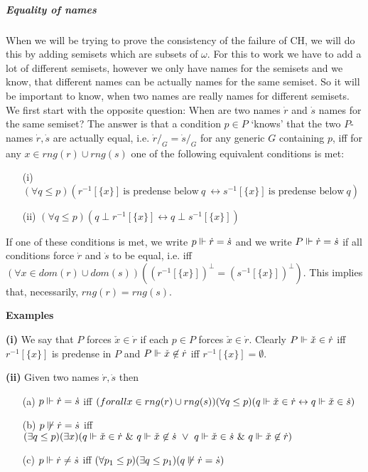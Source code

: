 \subparagraph{Equality of names}
When we will be trying to prove the consistency of the failure of CH, we will do this by adding semisets which are subsets of $\omega$.
For this to work we have to add a lot of different semisets, however we only have names for the semisets and we know, that different
names can be actually names for the same semiset. So it will be important to know, when two names are really names for different semisets.
We first start with the opposite question: When are two names $\dot{r}$ and $\dot{s}$ names for the same semiset?
The answer is that a condition $p\in P$ `knows' that the two $P$-names $\dot{r},\dot{s}$ are actually equal, i.e. $\dot{r}/_G=\dot{s}/_G$ for any generic $G$ containing $p$, iff for any $x\in rng(r)\cup rng(s)$ one of the following equivalent conditions is met:
\begin{itemize}
 \item[(i)]  $(\forall q\leq p)(r^{-1}[\{x\}]\ \mbox{is predense below}\ q\ \leftrightarrow s^{-1}[\{x\}]\ \mbox{is predense below}\ q)$
 \item[(ii)] $(\forall q\leq p)(q\perp r^{-1}[\{x\}]\leftrightarrow q\perp s^{-1}[\{x\}])$
\end{itemize}
If one of these conditions is met, we write $p\Vdash\dot{r}=\dot{s}$ and we write $P\Vdash\dot{r}=\dot{s}$ if all conditions
force $\dot{r}$ and $\dot{s}$ to be equal, i.e. iff $(\forall x\in dom(r)\cup dom(s) )((r^{-1}[\{x\}])^\perp = (s^{-1}[\{x\}])^\perp)$. This
implies that, necessarily, $rng(r)=rng(s)$.


{\bf Examples}

{\bf (i)} We say that $P$ forces $\check{x}\in\dot{r}$ if each $p\in P$ forces $\check{x}\in\dot{r}$. Clearly
$P\Vdash\check{x}\in\dot{r}$ iff $r^{-1}[\{x\}]$ is predense in $P$ and $P\Vdash\check{x}\not\in\dot{r}$ iff
$r^{-1}[\{x\}]=\emptyset$.

{\bf (ii)} Given two names $\dot{r},\dot{s}$ then
\begin{itemize}
 \item[(a)] $p\Vdash\dot{r}=\dot{s}$ iff $(forall x\in rng(r)\cup rng(s))(\forall q\leq p)(q\Vdash \check{x}\in\dot{r} \leftrightarrow q\Vdash\check{x}\in\dot{s})$
 \item[(b)] $p\not\Vdash\dot{r}=\dot{s}$ iff $(\exists q\leq p)(\exists x)(q\force\check{x}\in\dot{r}\ \&\ q\force\check{x}\not\in\dot{s}\ \vee\
                                                                           q\force\check{x}\in\dot{s}\ \&\ q\force\check{x}\not\in\dot{r})$
 \item[(c)] $p\Vdash\dot{r}\neq\dot{s}$ iff $(\forall p_1\leq p)(\exists q\leq p_1)(q\not\Vdash\dot{r}=\dot{s})$
\end{itemize}

